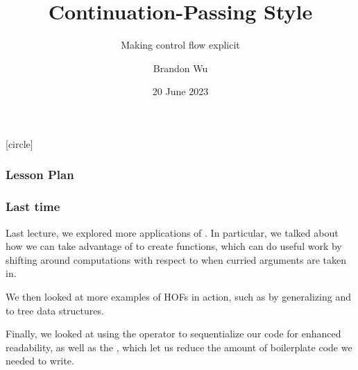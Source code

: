 \documentclass[aspectratio=169, handout]{beamer}
\title{Continuation-Passing Style} %
\subtitle{Making control flow explicit} %
\date{20 June 2023} %
\author{Brandon Wu} %
\newif\ifcolorlambda
\begin{document}
\ifweb
    \renewcommand{\pause}{}
\fi

[circle]

{
\begin{frame}[plain]
    \colorlambdatrue
    \titlepage
\end{frame}
}


\begin{frame}[fragile]
  \frametitle{Lesson Plan}

  \tableofcontents
\end{frame}

\begin{frame}[fragile]
  \frametitle{Last time}

  Last lecture, we explored more applications of .
  In particular, we talked about how we can take advantage of 
  to create  functions, which can do useful work by shifting
  around computations with respect to when curried arguments are taken in.

  \pause
  \vspace{\fill}

  We then looked at more examples of HOFs in action, such as by generalizing
   and  to tree data structures.

  \pause
  \vspace{\fill}

  Finally, we looked at using the \code{|>} operator to sequentialize our
  code for enhanced readability, as well as the , which
  let us reduce the amount of boilerplate code we needed to write.
\end{frame}

\end{document}
